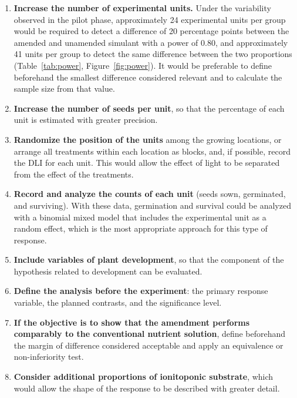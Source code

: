 \documentclass[11pt]{article}
\begin{document}
\begin{enumerate}[leftmargin=1.6em,itemsep=2pt]
\item \textbf{Increase the number of experimental units.} Under the variability observed in the pilot phase, approximately 24 experimental units per group would be required to detect a difference of 20 percentage points between the amended and unamended simulant with a power of 0.80, and approximately 41 units per group to detect the same difference between the two proportions (Table~\ref{tab:power}, Figure~\ref{fig:power}). It would be preferable to define beforehand the smallest difference considered relevant and to calculate the sample size from that value.
\item \textbf{Increase the number of seeds per unit}, so that the percentage of each unit is estimated with greater precision.
\item \textbf{Randomize the position of the units} among the growing locations, or arrange all treatments within each location as blocks, and, if possible, record the DLI for each unit. This would allow the effect of light to be separated from the effect of the treatments.
\item \textbf{Record and analyze the counts of each unit} (seeds sown, germinated, and surviving). With these data, germination and survival could be analyzed with a binomial mixed model that includes the experimental unit as a random effect, which is the most appropriate approach for this type of response.
\item \textbf{Include variables of plant development}, so that the component of the hypothesis related to development can be evaluated.
\item \textbf{Define the analysis before the experiment}: the primary response variable, the planned contrasts, and the significance level.
\item \textbf{If the objective is to show that the amendment performs comparably to the conventional nutrient solution}, define beforehand the margin of difference considered acceptable and apply an equivalence or non-inferiority test.
\item \textbf{Consider additional proportions of ionitoponic substrate}, which would allow the shape of the response to be described with greater detail.
\end{enumerate}

\begin{table}[H]
\caption{\capTabI}\label{tab:power}
\end{table}
\end{document}
